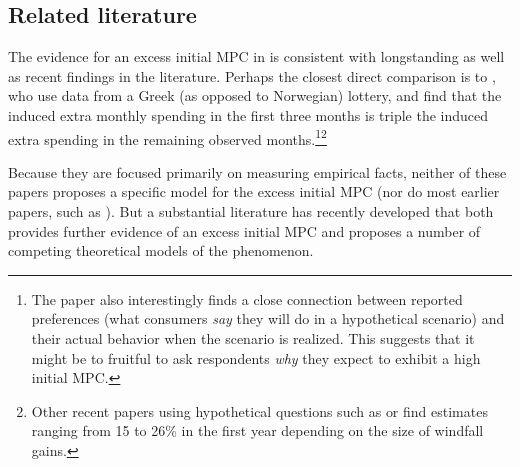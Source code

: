 \documentclass[\econtexRoot/HAFiscal]{subfiles}
\begin{document}
\hypertarget{related-literature}{}\par\subsection{Related literature}
\notinsubfile{\label{sec:lit}}

\hypertarget{excess-initial-mpc-literature}{}
\hypertarget{kotsogiannisMPCs}{}

The evidence for an excess initial MPC in \cite{fagereng_mpc_2021} is consistent with longstanding as well as recent findings in the literature.  Perhaps the closest direct comparison is to \cite{kotsogiannisMPCs}, who use data from a Greek (as opposed to Norwegian) lottery, and find that the induced extra monthly spending in the first three months is triple the induced extra spending in the remaining observed months.\footnote{The paper also interestingly finds a close connection between reported preferences (what consumers \textit{say} they will do in a hypothetical scenario) and their actual behavior when the scenario is realized.  This suggests that it might be to fruitful to ask respondents \textit{why} they expect to exhibit a high initial MPC.}\footnote{Other recent papers using hypothetical questions such as \cite{jappelli2024intertemporal} or \cite{colarieti2024and} find estimates ranging from 15 to 26\% in the first year depending on the size of windfall gains.}  

Because they are focused primarily on measuring empirical facts, neither of these papers proposes a specific model for the excess initial MPC (nor do most earlier papers, such as \cite{parker2013consumer,jpsTax}).  But a substantial literature has recently developed that both provides further evidence of an excess initial MPC and proposes a number of competing theoretical models of the phenomenon.  

\hypertarget{laibson2022simple}{}
\end{document}
